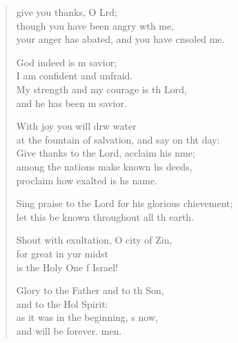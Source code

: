 \settowidth{\versewidth}{Sing praise to the Lord for his glorious achievement; *}
\begin{verse}%
  \begin{patverse}
     give you thanks, O Lrd;\Flex\\
though you have been angry w\pointup{\i}th me,\Med\\
your anger has abated, and you have cnsoled me.

God indeed is m savior;\Med\\
I am confident and unfraid.\\
My strength and my courage is th Lord,\Med\\
and he has been m savior.

With joy you will drw water\Med\\
at the fountain of salvation, and say on tht day:\\
Give thanks to the Lord, acclaim his nme;\Flex\\
among the nations make known h\pointup{\i}s deeds,\Med\\
proclaim how exalted is h\pointup{\i}s name.

Sing praise to the Lord for his glorious chievement;\Med\\
let this be known throughout all th earth.

Shout with exultation, O city of Zin,\Flex\\
for great in yur midst\Med\\
is the Holy One f Israel!

Glory to the Father and to th Son,\Med\\
and to the Hol Spirit:\\
as it was in the beginning, \pointup{\i}s now,\Med\\
and will be forever. men. 
  \end{patverse}
\end{verse}
